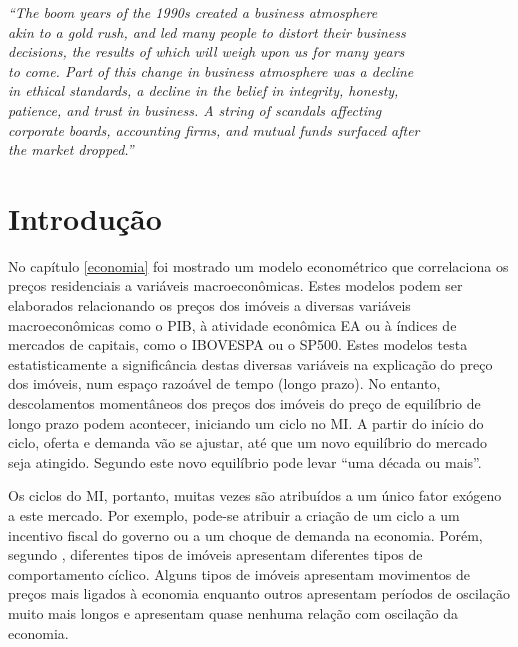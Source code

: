 \documentclass[
	12pt,				%
	oneside,			%
	a4paper,			%
	chapter=TITLE,		%
	section=TITLE,		%
	english,			%
	brazil				%
	]{abntex2}
\begin{document}
\begin{refsection}
\begin{epigrafe}
    \vspace*{\fill}
    \begin{flushright}
    \textit{``The boom years of the 1990s created a business atmosphere\\
    akin to a gold rush, and led many people to distort their business\\
    decisions, the results of which will weigh upon us for many years\\
    to come. Part of this change in business atmosphere was a decline\\
    in ethical standards, a decline in the belief in integrity, honesty,\\
    patience, and trust in business. A string of scandals affecting\\ 
    corporate boards, accounting firms, and mutual funds surfaced after\\
    the market dropped.''\\
    \cite[p. xiv]{shiller}}
    \end{flushright}
\end{epigrafe}
\hypertarget{introduuxe7uxe3o-4}{%
\section{Introdução}\label{introduuxe7uxe3o-4}}

No capítulo \ref{economia} foi mostrado um modelo econométrico que correlaciona
os preços residenciais a variáveis macroeconômicas. Estes modelos podem ser
elaborados relacionando os preços dos imóveis a diversas variáveis
macroeconômicas como o \gls{PIB}, à atividade econômica \gls{EA} ou à índices de
mercados de capitais, como o \gls{IBOVESPA} ou o \gls{SP500}. Estes modelos
testa estatisticamente a significância destas diversas variáveis na explicação
do preço dos imóveis, num espaço razoável de tempo (longo prazo). No entanto,
descolamentos momentâneos dos preços dos imóveis do preço de equilíbrio de
longo prazo podem acontecer, iniciando um ciclo no \gls{MI}. A partir do início
do ciclo, oferta e demanda vão se ajustar, até que um novo equilíbrio do mercado
seja atingido. Segundo \textcite[p.~18]{regulation} este novo equilíbrio pode levar ``uma
década ou mais''.

Os ciclos do \gls{MI}, portanto, muitas vezes são atribuídos a um único fator
exógeno a este mercado. Por exemplo, pode-se atribuir a criação de um ciclo a um
incentivo fiscal do governo ou a um choque de demanda na economia. Porém,
segundo \textcite[p.~209-210]{wheaton1999}, diferentes tipos de imóveis apresentam
diferentes tipos de comportamento cíclico. Alguns tipos de imóveis apresentam
movimentos de preços mais ligados à economia enquanto outros apresentam períodos
de oscilação muito mais longos e apresentam quase nenhuma relação com oscilação
da economia.


\end{refsection}
\end{document}
